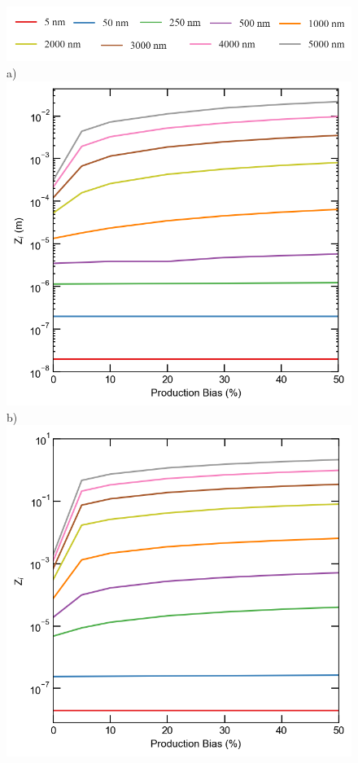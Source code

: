 \documentclass[utf8]{frontiersSCNS} %
\begin{document}
    \begin{figure}[h!]  %
        \centering
        \includegraphics[scale=0.3]{Fig_legend}\\
        a)\includegraphics[scale=0.5]{Fig10_a}
        b)\includegraphics[scale=0.5]{Fig10_b}

\end{figure}
\end{document}
